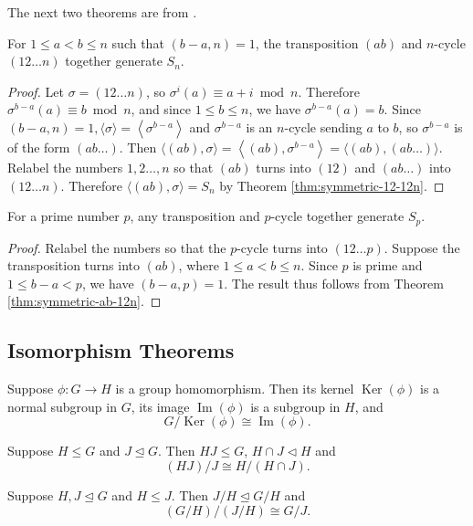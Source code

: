 The next two theorems are from \cite{generating-sets}. 

\begin{theorem} \label{thm:symmetric-ab-12n}
	For $1 \le a < b \le n$ such that $(b - a, n) = 1$, the transposition $(ab)$ and $n$-cycle $(12 \dots n)$ together generate $S_n$.
\end{theorem}
\begin{proof}
	Let $\sigma=(12 \ldots n)$, so $\sigma^i(a) \equiv a+i \bmod n$. Therefore $\sigma^{b-a}(a) \equiv b \bmod n$, and since $1 \le b \le n$, we have $\sigma^{b-a}(a)=b$. Since $(b-a, n)=1,\langle\sigma\rangle=\left\langle\sigma^{b-a}\right\rangle$ and $\sigma^{b-a}$ is an $n$-cycle sending $a$ to $b$, so $\sigma^{b-a}$ is of the form $(a b \ldots)$. Then
	$
	\langle(a b), \sigma\rangle=\left\langle(a b), \sigma^{b-a}\right\rangle=\langle(a b),(a b \ldots)\rangle .
	$
	Relabel the numbers $1,2 \ldots, n$ so that $(a b)$ turns into $(12)$ and $(a b \ldots)$ into $(12 \ldots n)$. Therefore $\langle(a b), \sigma\rangle=S_n$ by Theorem \ref{thm:symmetric-12-12n}.
\end{proof}

\begin{theorem} \label{thm:symmetric-prime}
	For a prime number $p$, any transposition and $p$-cycle together generate $S_p$.
\end{theorem}
\begin{proof}
	Relabel the numbers so that the $p$-cycle turns into $(12 \dots p)$. Suppose the transposition turns into $(ab)$, where $1 \le a < b \le n$. Since $p$ is prime and $1 \le b - a < p$, we have $(b - a, p) = 1$. The result thus follows from Theorem \ref{thm:symmetric-ab-12n}.
\end{proof}

\subsection{Isomorphism Theorems}

\begin{theorem} \label{thm:first-iso}
	Suppose $\phi: G \to H$ is a group homomorphism. Then its kernel $\operatorname{Ker}(\phi)$ is a normal subgroup in $G$, its image $\operatorname{Im}(\phi)$ is a subgroup in $H$, and 
	$$
	G / \operatorname{Ker}(\phi) \cong \operatorname{Im}(\phi).
	$$
\end{theorem}

\begin{theorem} \label{thm:second-iso}
	Suppose $H \le G$ and $J \trianglelefteq G$. Then $HJ \le G$, $H \cap J \triangleleft H$ and $$
	(HJ) / J \cong H / (H \cap J). 
	$$
\end{theorem}
\begin{theorem} \label{thm:third-iso}
	Suppose $H, J \trianglelefteq G$ and $H \le J$. Then $J/H \trianglelefteq G/H$ and $$
	(G/H)/(J/H) \cong G / J.    $$
\end{theorem}



